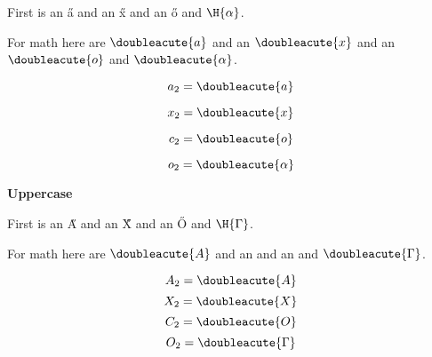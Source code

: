 \documentclass{article}
\begin{document}
First is an \H{a} and an \H{x} and an \H{o} and $\H{\alpha}$.

For math here are $\doubleacute{a}$ and an $\doubleacute{x}$ and an $\doubleacute{o}$ and $\doubleacute{\alpha}$.

$$a_2=\doubleacute{a}$$

$$x_2=\doubleacute{x}$$

$$c_2=\doubleacute{o}$$

$$o_2=\doubleacute{\alpha}$$

\textbf{Uppercase}

First is an \H{A} and an \H{X} and an \H{O} and $\H{\Gamma}$.

For math here are $\doubleacute{A}$ and an  and an  and $\doubleacute{\Gamma}$.

$$A_2=\doubleacute{A}$$
$$X_2=\doubleacute{X}$$
$$C_2=\doubleacute{O}$$
$$O_2=\doubleacute{\Gamma}$$
\end{document}
